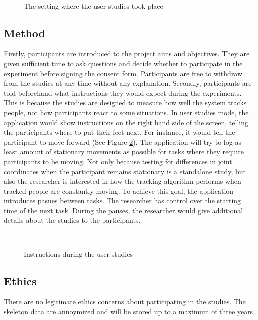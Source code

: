 \documentclass{sigchi}
\begin{document}
\begin{figure}[!h]
  \centering
  
  \caption{The setting where the user studies took place}~\label{fig:studies_setting}
\end{figure}

\subsection{Method}

Firstly, participants are introduced to the project aims and objectives. They are given sufficient time to ask questions and decide whether to participate in the experiment before signing the consent form. Participants are free to withdraw from the studies at any time without any explanation. Secondly, participants are told beforehand what instructions they would expect during the experiments. This is because the studies are designed to measure how well the system tracks people, not how participants react to some situations. In user studies mode, the application would show instructions on the right hand side of the screen, telling the participants where to put their feet next. For instance, it would tell the participant to move forward (See Figure \ref{fig:studies_instruction}). The application will try to log as least amount of stationary movements as possible for tasks where they require participants to be moving. Not only because testing for differences in joint coordinates when the participant remains stationary is a standalone study, but also the researcher is interested in how the tracking algorithm performs when tracked people are constantly moving. To achieve this goal, the application introduces pasues between tasks. The researcher has control over the starting time of the next task. During the pauses, the researcher would give additional details about the studies to the participants.

\begin{figure}[!h]
  \centering
  
  \caption{Instructions during the user studies}~\label{fig:studies_instruction}
\end{figure}

\subsection{Ethics}

There are no legitimate ethics concerns about participating in the studies. The skeleton data are annoymized and will be stored up to a maximum of three years.
\end{document}
